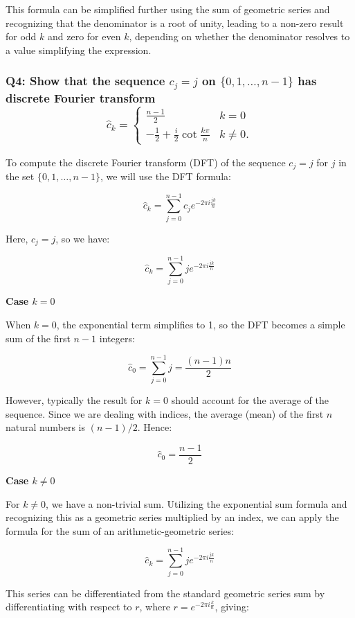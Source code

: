 \documentclass[8pt]{article}
\begin{document}
{This formula can be simplified further using the sum of geometric series and recognizing that the denominator is a root of unity, leading to a non-zero result for odd \( k \) and zero for even \( k \), depending on whether the denominator resolves to a value simplifying the expression.

\subsubsection*{Q4:
Show that the sequence \( c_j = j \) on \(\{0, 1, \ldots, n-1\}\) has discrete Fourier transform
\[
   \hat{c}_k = \begin{cases} 
   \frac{n-1}{2} & k = 0 \\
   -\frac{1}{2} + \frac{i}{2} \cot \frac{k\pi}{n} & k \neq 0.
   \end{cases}
\]}

To compute the discrete Fourier transform (DFT) of the sequence \(c_j = j\) for \(j\) in the set \(\{0, 1, \ldots, n-1\}\), we will use the DFT formula:

\[
\hat{c}_k = \sum_{j=0}^{n-1} c_j e^{-2\pi i \frac{jk}{n}}
\]

Here, \(c_j = j\), so we have:

\[
\hat{c}_k = \sum_{j=0}^{n-1} j e^{-2\pi i \frac{jk}{n}}
\]

\textbf{Case \(k = 0\)}

When \(k = 0\), the exponential term simplifies to 1, so the DFT becomes a simple sum of the first \(n-1\) integers:

\[
\hat{c}_0 = \sum_{j=0}^{n-1} j = \frac{(n-1) n}{2}
\]

However, typically the result for \(k = 0\) should account for the average of the sequence. Since we are dealing with indices, the average (mean) of the first \(n\) natural numbers is \((n-1)/2\). Hence:

\[
\hat{c}_0 = \frac{n-1}{2}
\]

\textbf{Case \(k \neq 0\)}

For \(k \neq 0\), we have a non-trivial sum. Utilizing the exponential sum formula and recognizing this as a geometric series multiplied by an index, we can apply the formula for the sum of an arithmetic-geometric series:

\[
\hat{c}_k = \sum_{j=0}^{n-1} j e^{-2\pi i \frac{jk}{n}}
\]

This series can be differentiated from the standard geometric series sum by differentiating with respect to \(r\), where \(r = e^{-2\pi i \frac{k}{n}}\), giving:

}
\end{document}
